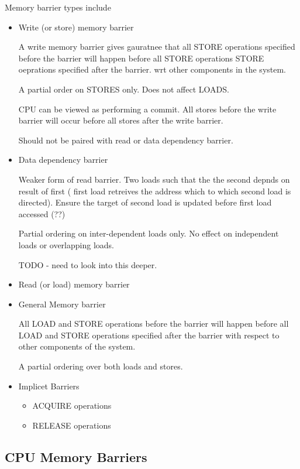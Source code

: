 \documentclass{article}
\begin{document}
Memory barrier types include
\begin{itemize}
\item Write (or store) memory barrier

  A write memory barrier gives gauratnee that all STORE operations
  specified before the barrier will happen before all STORE operations
  STORE oeprations specified after the barrier. wrt other components
  in the system.

  A partial order on STORES only. Does not affect LOADS.

  CPU can be viewed as performing a commit. All stores before the
  write barrier will occur before all stores after the write barrier.

  Should not be paired with read or data dependency barrier.
  
\item Data dependency barrier

  Weaker form of read barrier. Two loads such that the the second
  depnds on result of first ( first load retreives the address which
  to which second load is directed). Ensure the target of second load
  is updated before first load accessed (??)

  Partial ordering on inter-dependent loads only. No effect on
  independent loads or overlapping loads.


  TODO - need to look into this deeper.


\item Read (or load) memory barrier  

  
  
\item General Memory barrier

  All LOAD and STORE operations before the barrier will happen before
  all LOAD and STORE operations specified after the barrier with
  respect to other components of the system.

  A partial ordering over both loads and stores.  

\item Implicet Barriers
  \begin{itemize}
  \item ACQUIRE operations
  \item RELEASE operations
  \end{itemize}
\end{itemize}



\subsection{CPU Memory Barriers}
\end{document}
